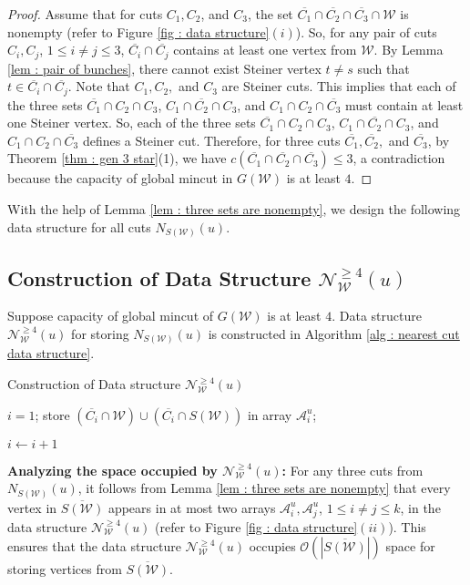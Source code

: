 \documentclass[letterpaper,11pt]{article}
\begin{document}
\begin{proof}
    Assume that for cuts $C_1,C_2$, and $C_3$, the set $\overline{C_1}\cap \overline{C_2} \cap \overline{C_3}\cap {\mathcal W}$ is nonempty (refer to Figure \ref{fig : data structure}$(i)$). So, for any pair of cuts $C_i,C_j$, $1\le i\ne j\le 3$, $\overline{C_i}\cap \overline{C_j}$ contains at least one vertex from ${\mathcal W}$. By Lemma \ref{lem : pair of bunches}, there cannot exist Steiner vertex $t\ne s$ such that $t\in \overline{C_i}\cap \overline{C_j}$. Note that $C_1,C_2,$ and $C_3$ are Steiner cuts. This implies that each of the three sets $\overline{C_1}\cap C_2 \cap C_3$, $C_1\cap \overline{C_2}\cap C_3$, and $C_1\cap C_2 \cap \overline{C_3}$ must contain at least one Steiner vertex. So, each of the three sets $\overline{C_1}\cap C_2 \cap C_3$, $C_1\cap \overline{C_2}\cap C_3$, and $C_1\cap C_2 \cap \overline{C_3}$ defines a Steiner cut. Therefore, for three cuts $\overline{C_1},\overline{C_2},$ and $\overline{C_3}$, by Theorem \ref{thm : gen 3 star}(1), we have $c(\overline{C_1}\cap \overline{C_2} \cap \overline{C_3})\le 3$, a contradiction because the capacity of global mincut in $G({\mathcal W})$ is at least $4$.      
\end{proof}
With the help of Lemma \ref{lem : three sets are nonempty}, we design the following data structure for all cuts $N_{S({\mathcal W})}(u)$.


\subsection*{Construction of Data Structure ${\mathcal N}^{\ge 4}_{\mathcal W}(u)$}
Suppose capacity of global mincut of $G({\mathcal W})$ is at least $4$. Data structure ${\mathcal N}^{\ge 4}_{\mathcal W}(u)$ for storing $N_{S({\mathcal W})}(u)$ is constructed in Algorithm \ref{alg : nearest cut data structure}. 
\begin{algorithm}[H]
\caption{Construction of Data structure ${\mathcal N}^{\ge 4}_{\mathcal W}(u)$}
\label{alg : nearest cut data structure}
\begin{algorithmic}[1]
    \State $i=1$;
          \State store $(\overline{C_i}\cap {\mathcal W})\cup (\overline{C_i}\cap S({\mathcal W}))$ in array ${\mathcal A}_i^u$; 

\State $i\gets i+1$
    \EndFor
\EndProcedure
\end{algorithmic}
\end{algorithm}
\noindent
\textbf{Analyzing the space occupied by ${\mathcal N}^{\ge 4}_{\mathcal W}(u)$:} 
For any three cuts from $N_{S({\mathcal W})}(u)$, it follows from Lemma \ref{lem : three sets are nonempty} that 
every vertex in $\overline{S({\mathcal W})}$ appears in at most two arrays ${\mathcal A}_i^u, {\mathcal A}_j^u$, $1\le i\ne j\le k$, in the data structure ${\mathcal N}^{\ge 4}_{\mathcal W}(u)$ (refer to Figure \ref{fig : data structure}$(ii)$). This ensures that the data structure ${\mathcal N}^{\ge 4}_{\mathcal W}(u)$ occupies ${\mathcal O}(|\overline{S({\mathcal W})}|)$ space for storing vertices from $\overline{S({\mathcal W})}$.\\ 
\end{document}
